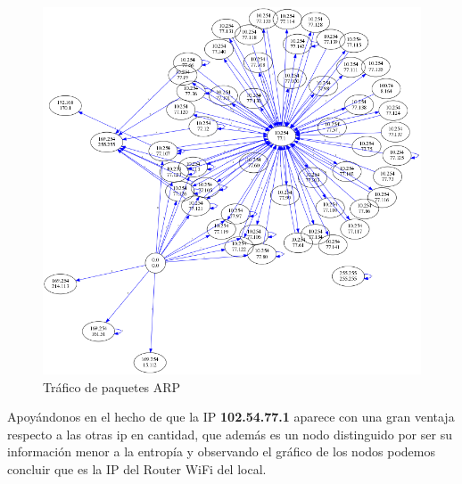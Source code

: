\begin{figure}[H]
       \centering
       \includegraphics[width=1\textwidth]{../resultados/Starbucks/network.png}
       \caption{Tráfico de paquetes ARP}
       \label{red-Starbucks-dst-information}
\end{figure}

Apoyándonos en el hecho de que la IP \textbf{102.54.77.1} aparece con una gran ventaja respecto a las otras ip en cantidad, que además es un nodo distinguido por ser su información menor a la entropía y observando el gráfico de los nodos podemos concluir que es la IP del Router WiFi del local.

